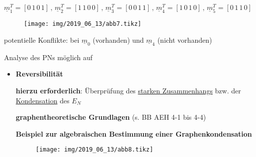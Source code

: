 \begin{itemize}
	$\underline{m}_1^{T} = [0\, 1\, 0\,  1] \, , \, \underline{m}_2^{T} = [1\, 1\, 0\,  0] \, , \,\underline{m}_3^{T} = [0\, 0\, 1\,  1] \, , \, \underline{m}_4^{T} = [1\, 0\, 1\,  0] \, , \, \underline{m}_5^{T} = [0\, 1\, 1\,  0] $
	\begin{figure}[H]
		\centering
		\texttt{[image: img/2019\_06\_13/abb7.tikz]}
	\end{figure}
	
	potentielle Konflikte: bei $\underline{m}_0$ (vorhanden) und $\underline{m}_4$ (nicht vorhanden)
\end{itemize}


Analyse des PNs möglich auf
\begin{itemize}
	\item{\textbf{Reversibilität}}  
	
	\textbf{hierzu erforderlich}: Überprüfung des \underline{starken Zusammenhangs} bzw. der \underline{Kondensation} des $E_N$
	
	\textbf{graphentheoretische Grundlagen} (s. BB AEH 4-1 bis 4-4)
	
	\textbf{Beispiel zur algebraischen Bestimmung einer Graphenkondensation}
	\begin{figure}[H]
		\centering
		\texttt{[image: img/2019\_06\_13/abb8.tikz]}
	\end{figure}
	
\end{itemize}